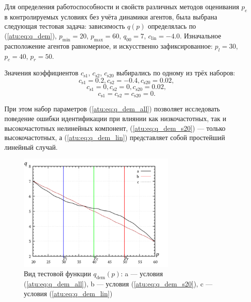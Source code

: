 Для определения работоспособности и свойств различных методов оценивания $p_e$
в контролируемых условиях без учёта динамики агентов, была выбрана следующая
тестовая задача: зависимость $q(p)$ определялась по (\ref{atu:eq:q_dem}),
$p_{\min}=20$, $p_{\max}=60$,
$q_{00}=7$, $c_\mathrm{lin}=-4.0$.
Изначальное расположение агентов равномерное, и искусственно  зафиксированное:
$p_l=30$, $p_c=40$,  $p_r=50$.

Значения коэффициентов
$c_\mathrm{s1}$, $c_\mathrm{s2}$, $c_\mathrm{s20}$
выбирались по одному из трёх наборов:
%
\begin{equation}
  c_\mathrm{s1} = 0.2, c_\mathrm{s2} = -0.4, c_\mathrm{s20} = 0.02,
  \label{atu:eq:q_dem_all}
\end{equation}
%
\begin{equation}
  c_\mathrm{s1} = 0, c_\mathrm{s2} = 0, c_\mathrm{s20} = 0.02,
  \label{atu:eq:q_dem_s20}
\end{equation}
%
\begin{equation}
  c_\mathrm{s1} = c_\mathrm{s2} = c_\mathrm{s20} = 0 .
  \label{atu:eq:q_dem_lin}
\end{equation}

При этом набор параметров (\ref{atu:eq:q_dem_all})
позволяет исследовать поведение ошибки идентификации при
влиянии как низкочастотных, так и высокочастотных
нелинейных компонент,
(\ref{atu:eq:q_dem_s20}) --- только высокочастотных,
а (\ref{atu:eq:q_dem_lin}) представляет собой
простейший линейный случай.

\begin{figure}[htb!]
  \centerline{\includegraphics[width=0.7\textwidth]{p/q_p_dem.png} }
  \caption{Вид тестовой функции $q_\mathrm{dem}(p)$:
     a --- условия (\ref{atu:eq:q_dem_all}),
     b --- условия (\ref{atu:eq:q_dem_s20}),
     c --- условия (\ref{atu:eq:q_dem_lin})
  }
  \label{atu:f:q_dem}
\end{figure}

